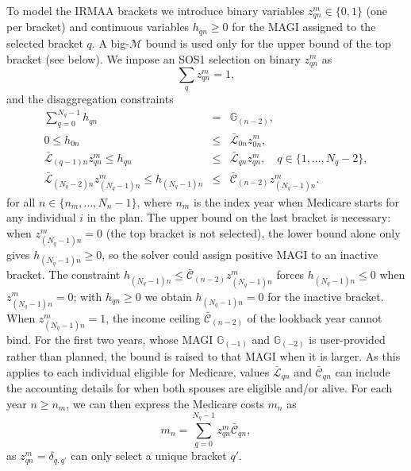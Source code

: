 \documentclass[fleqn,12pt]{report}
\begin{document}
        To model the IRMAA brackets we introduce
	binary variables $z_{qn}^m \in \{0, 1\}$ (one per bracket) and continuous
	variables $h_{qn} \ge 0$ for the MAGI assigned to the selected bracket $q$.
	A big-$\mathcal{M}$ bound is used only for the upper bound of the top bracket (see below).
	We impose an SOS1 selection on binary $z_{qn}^m$ as
	\begin{equation}
		\label{Eq:SOS1}
		\sum_q z_{qn}^m = 1,
	\end{equation}
	and the disaggregation constraints
	\begin{eqnarray}
		\sum_{q=0}^{N_q-1} h_{qn} &=& \mathbb{G}_{(n-2)}, \label{Eq:MedDecomp} \\
		0 \le h_{0n} &\le& \bar{\mathcal{L}}_{0n} z_{0n}^m, \nonumber \\
		\bar{\mathcal{L}}_{(q-1)n} z_{qn}^m \le h_{qn} &\le& \bar{\mathcal{L}}_{qn} z_{qn}^m,
		\quad q \in \{1, \ldots, N_q-2\}, \label{Eq:MedDecomph}\\
		\bar{\mathcal{L}}_{(N_q-2)n} z_{(N_q-1)n}^m \le h_{(N_q-1)n} &\le&
		\bar{\mathcal{C}}_{(n-2)} z_{(N_q-1)n}^m. \nonumber
	\end{eqnarray}
	for all $n \in \{n_m, \ldots, N_n-1\}$, where $n_{m}$ is the index year when
	Medicare starts for any individual $i$ in the plan.
	The upper bound on the last bracket is necessary: when $z_{(N_q-1)n}^m = 0$
	(the top bracket is not selected), the lower bound alone only gives
	$h_{(N_q-1)n} \ge 0$, so the solver could assign positive MAGI to an inactive
	bracket. The constraint $h_{(N_q-1)n} \le \bar{\mathcal{C}}_{(n-2)} z_{(N_q-1)n}^m$
	forces $h_{(N_q-1)n} \le 0$ when $z_{(N_q-1)n}^m = 0$; with $h_{qn} \ge 0$ we
	obtain $h_{(N_q-1)n} = 0$ for the inactive bracket. When $z_{(N_q-1)n}^m = 1$,
	the income ceiling $\bar{\mathcal{C}}_{(n-2)}$ of the lookback year cannot bind.
	For the first two years, whose MAGI $\mathbb{G}_{(-1)}$ and $\mathbb{G}_{(-2)}$ is
	user-provided rather than planned, the bound is raised to that MAGI when it is larger.
        As this applies to each individual eligible for Medicare, values
	$\bar{\mathcal{L}}_{qn}$ and  $\bar{\mathcal{C}}_{qn}$
	can include the accounting details for when both spouses are eligible and/or alive.
        For each year $n \geq n_m$, we can then express the Medicare costs $m_n$ as
	\begin{equation}
		\label{Eq:MediCosts}
		m_n = \sum_{q=0}^{N_q - 1} z_{qn}^m \bar{\mathcal{C}}_{qn},
	\end{equation}
	as $z_{qn}^m = \delta_{q,q'}$ can only select a unique bracket $q'$.
\end{document}

